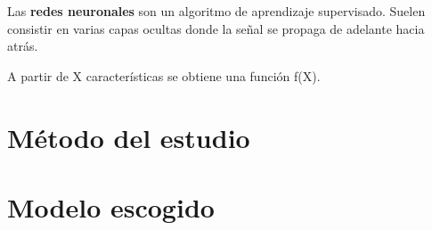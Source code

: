 	Las \textbf{redes neuronales} son un algoritmo de aprendizaje supervisado. Suelen consistir en varias capas ocultas donde la señal se propaga de adelante hacia atrás.
	
	A partir de X características se obtiene una función f(X).
	
\section{Método del estudio}
\label{makereference4.4}

\section{Modelo escogido}
\label{makereference4.5}
